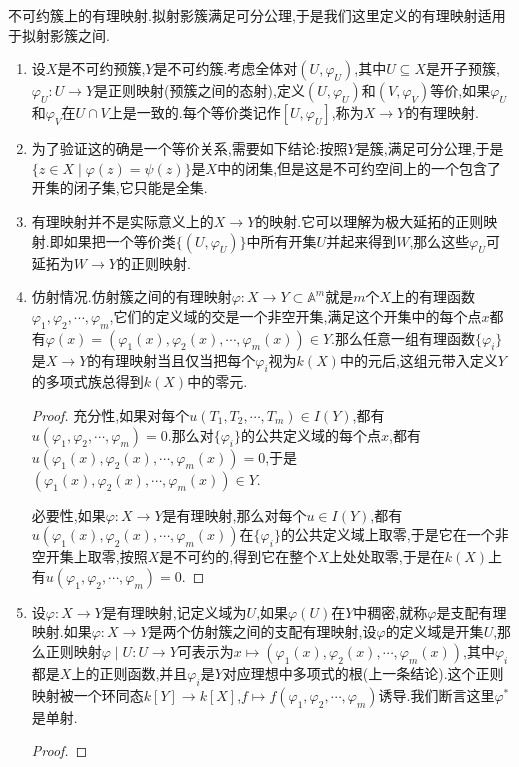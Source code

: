 不可约簇上的有理映射.拟射影簇满足可分公理,于是我们这里定义的有理映射适用于拟射影簇之间.
\begin{enumerate}
	\item 设$X$是不可约预簇,$Y$是不可约簇.考虑全体对$(U,\varphi_U)$,其中$U\subseteq X$是开子预簇,$\varphi_U:U\to Y$是正则映射(预簇之间的态射),定义$(U,\varphi_U)$和$(V,\varphi_V)$等价,如果$\varphi_U$和$\varphi_V$在$U\cap V$上是一致的.每个等价类记作$[U,\varphi_U]$,称为$X\to Y$的有理映射.
	\item 为了验证这的确是一个等价关系,需要如下结论:按照$Y$是簇,满足可分公理,于是$\{z\in X\mid\varphi(z)=\psi(z)\}$是$X$中的闭集,但是这是不可约空间上的一个包含了开集的闭子集,它只能是全集.
	\item 有理映射并不是实际意义上的$X\to Y$的映射.它可以理解为极大延拓的正则映射.即如果把一个等价类$\{(U,\varphi_U)\}$中所有开集$U$并起来得到$W$,那么这些$\varphi_U$可延拓为$W\to Y$的正则映射.
	\item 仿射情况.仿射簇之间的有理映射$\varphi:X\to Y\subset\mathbb{A}^m$就是$m$个$X$上的有理函数$\varphi_1,\varphi_2,\cdots,\varphi_m$,它们的定义域的交是一个非空开集,满足这个开集中的每个点$x$都有$\varphi(x)=(\varphi_1(x),\varphi_2(x),\cdots,\varphi_m(x))\in Y$.那么任意一组有理函数$\{\varphi_i\}$是$X\to Y$的有理映射当且仅当把每个$\varphi_i$视为$k(X)$中的元后,这组元带入定义$Y$的多项式族总得到$k(X)$中的零元.
	\begin{proof}
		
		充分性,如果对每个$u(T_1,T_2,\cdots,T_m)\in I(Y)$,都有$u(\varphi_1,\varphi_2,\cdots,\varphi_m)=0$.那么对$\{\varphi_i\}$的公共定义域的每个点$x$,都有$u(\varphi_1(x),\varphi_2(x),\cdots,\varphi_m(x))=0$,于是$(\varphi_1(x),\varphi_2(x),\cdots,\varphi_m(x))\in Y$.
		
		必要性,如果$\varphi:X\to Y$是有理映射,那么对每个$u\in I(Y)$,都有$u(\varphi_1(x),\varphi_2(x),\cdots,\varphi_m(x))$在$\{\varphi_i\}$的公共定义域上取零,于是它在一个非空开集上取零,按照$X$是不可约的,得到它在整个$X$上处处取零,于是在$k(X)$上有$u(\varphi_1,\varphi_2,\cdots,\varphi_m)=0$.
	\end{proof}
    \item 设$\varphi:X\to Y$是有理映射,记定义域为$U$,如果$\varphi(U)$在$Y$中稠密,就称$\varphi$是支配有理映射.如果$\varphi:X\to Y$是两个仿射簇之间的支配有理映射,设$\varphi$的定义域是开集$U$,那么正则映射$\varphi\mid U:U\to Y$可表示为$x\mapsto(\varphi_1(x),\varphi_2(x),\cdots,\varphi_m(x))$,其中$\varphi_i$都是$X$上的正则函数,并且$\varphi_i$是$Y$对应理想中多项式的根(上一条结论).这个正则映射被一个环同态$k[Y]\to k[X]$,$f\mapsto f(\varphi_1,\varphi_2,\cdots,\varphi_m)$诱导.我们断言这里$\varphi^*$是单射.
    \begin{proof}
    	

\end{proof}
\end{enumerate}
